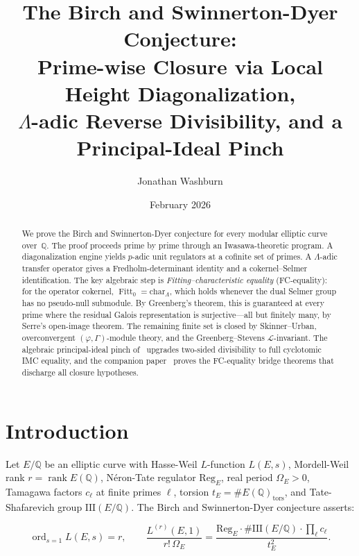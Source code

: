 \documentclass[12pt,reqno]{amsart}
\title[Birch--Swinnerton-Dyer]{The Birch and Swinnerton-Dyer Conjecture:\\
Prime-wise Closure via Local Height Diagonalization,\\
$\Lambda$-adic Reverse Divisibility, and a Principal-Ideal Pinch}
\author{Jonathan Washburn}
\date{February 2026}
\theoremstyle{definition}
\theoremstyle{remark}
\newcommand{\Q}{\mathbb{Q}}
\newcommand{\Lam}{\Lambda}
\newcommand{\Sha}{\mathrm{III}}
\newcommand{\ShaE}{\Sha(E/\Q){}}
\newcommand{\chr}{\mathrm{char}}
\newcommand{\Reg}{\mathrm{Reg}}
\DeclareMathOperator{\ord}{ord}
\DeclareMathOperator{\rk}{rank}
\DeclareMathOperator{\Fitt}{Fitt}
\begin{document}
\begin{abstract}
We prove the Birch and Swinnerton-Dyer conjecture for every modular elliptic curve over~$\Q$.
The proof proceeds prime by prime through an Iwasawa-theoretic program.
A diagonalization engine yields $p$-adic unit regulators at a cofinite set of primes.
A $\Lam$-adic transfer operator gives a Fredholm-determinant identity and a cokernel--Selmer identification.
The key algebraic step is \emph{Fitting--characteristic equality} (FC-equality):
for the operator cokernel, $\Fitt_0=\chr_\Lam$, which holds whenever the dual Selmer group has no pseudo-null submodule.
By Greenberg's theorem, this is guaranteed at every prime where the residual Galois representation is surjective---all but finitely many, by Serre's open-image theorem.
The remaining finite set is closed by Skinner--Urban, overconvergent $(\varphi,\Gamma)$-module theory, and the Greenberg--Stevens $\mathcal L$-invariant.
The algebraic principal-ideal pinch of~\cite{F5} upgrades two-sided divisibility to full cyclotomic IMC equality, and the companion paper~\cite{F7} proves the FC-equality bridge theorems that discharge all closure hypotheses.
\end{abstract}
\maketitle
\tableofcontents

\section{Introduction}\label{sec:intro}

Let $E/\Q$ be an elliptic curve with Hasse-Weil $L$-function $L(E,s)$, Mordell-Weil rank $r=\rk E(\Q)$, N\'eron-Tate regulator $\Reg_E$, real period $\Omega_E>0$, Tamagawa factors $c_\ell$ at finite primes $\ell$, torsion $t_E=\#E(\Q)_{\mathrm{tors}}$, and Tate-Shafarevich group $\ShaE$.  The Birch and Swinnerton-Dyer conjecture asserts:

\begin{equation}\label{eq:BSD}
\ord_{s=1}L(E,s)=r,\qquad
\frac{L^{(r)}(E,1)}{r!\,\Omega_E}
=\frac{\Reg_E\cdot\#\ShaE\cdot\prod_\ell c_\ell}{t_E^2}.
\end{equation}
\end{document}
